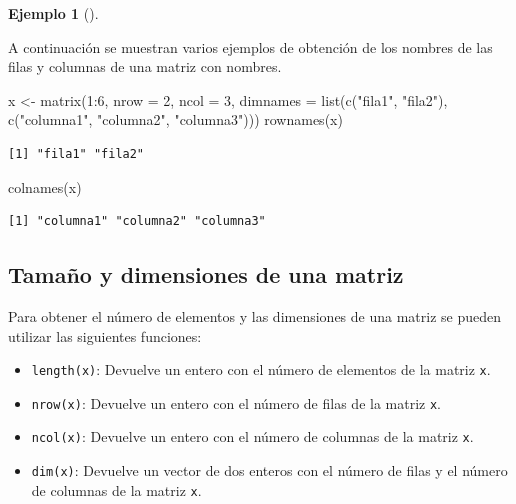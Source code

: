 \documentclass[
  a4paper,
]{scrreport}
\newenvironment{Shaded}{\begin{snugshade}}{\end{snugshade}}
\newcommand{\AttributeTok}[1]{\textcolor[rgb]{0.40,0.45,0.13}{#1}}
\newcommand{\DecValTok}[1]{\textcolor[rgb]{0.68,0.00,0.00}{#1}}
\newcommand{\FunctionTok}[1]{\textcolor[rgb]{0.28,0.35,0.67}{#1}}
\newcommand{\NormalTok}[1]{\textcolor[rgb]{0.00,0.23,0.31}{#1}}
\newcommand{\OtherTok}[1]{\textcolor[rgb]{0.00,0.23,0.31}{#1}}
\newcommand{\SpecialCharTok}[1]{\textcolor[rgb]{0.37,0.37,0.37}{#1}}
\newcommand{\StringTok}[1]{\textcolor[rgb]{0.13,0.47,0.30}{#1}}
\providecommand{\tightlist}{%
  \setlength{\itemsep}{0pt}\setlength{\parskip}{0pt}}\usepackage{longtable,booktabs,array}
\theoremstyle{definition}
\theoremstyle{definition}
\newtheorem{example}{Ejemplo}[chapter]
\theoremstyle{remark}
\begin{document}
\leavevmode{}%
\begin{example}[]\label{exm-obtencion-nombres-matriz}

A continuación se muestran varios ejemplos de obtención de los nombres
de las filas y columnas de una matriz con nombres.

\begin{Shaded}
\begin{Highlighting}[]
\NormalTok{x }\OtherTok{\textless{}{-}} \FunctionTok{matrix}\NormalTok{(}\DecValTok{1}\SpecialCharTok{:}\DecValTok{6}\NormalTok{, }\AttributeTok{nrow =} \DecValTok{2}\NormalTok{, }\AttributeTok{ncol =} \DecValTok{3}\NormalTok{, }\AttributeTok{dimnames =} \FunctionTok{list}\NormalTok{(}\FunctionTok{c}\NormalTok{(}\StringTok{"fila1"}\NormalTok{, }\StringTok{"fila2"}\NormalTok{), }\FunctionTok{c}\NormalTok{(}\StringTok{"columna1"}\NormalTok{, }\StringTok{"columna2"}\NormalTok{, }\StringTok{"columna3"}\NormalTok{)))}
\FunctionTok{rownames}\NormalTok{(x)}
\end{Highlighting}
\end{Shaded}

\begin{verbatim}
[1] "fila1" "fila2"
\end{verbatim}

\begin{Shaded}
\begin{Highlighting}[]
\FunctionTok{colnames}\NormalTok{(x)}
\end{Highlighting}
\end{Shaded}

\begin{verbatim}
[1] "columna1" "columna2" "columna3"
\end{verbatim}

\end{example}

\hypertarget{tamauxf1o-y-dimensiones-de-una-matriz}{%
\subsection{Tamaño y dimensiones de una
matriz}\label{tamauxf1o-y-dimensiones-de-una-matriz}}

Para obtener el número de elementos y las dimensiones de una matriz se
pueden utilizar las siguientes funciones:

\begin{itemize}
\tightlist
\item
  \texttt{length(x)}: Devuelve un entero con el número de elementos de
  la matriz \texttt{x}.
\item
  \texttt{nrow(x)}: Devuelve un entero con el número de filas de la
  matriz \texttt{x}.
\item
  \texttt{ncol(x)}: Devuelve un entero con el número de columnas de la
  matriz \texttt{x}.
\item
  \texttt{dim(x)}: Devuelve un vector de dos enteros con el número de
  filas y el número de columnas de la matriz \texttt{x}.
\end{itemize}
\end{document}
